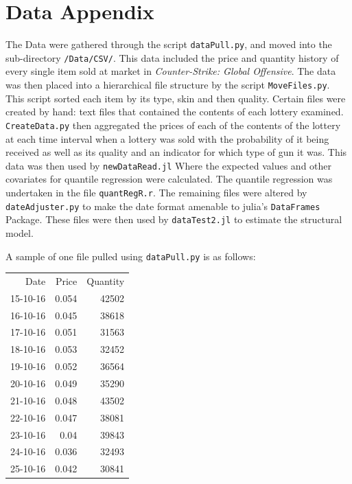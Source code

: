 \documentclass[12pt, letterpaper]{paper}
\begin{document}
\section{Data Appendix}
\label{sec-6}
The Data were gathered through the script \texttt{dataPull.py}, and moved
into the sub-directory \texttt{/Data/CSV/}. This data included the price and
quantity history of every single item sold at market in
\emph{Counter-Strike: Global Offensive}.
The data was then placed into a hierarchical file structure by the
script \texttt{MoveFiles.py}. This script sorted each item by its type, skin
and then quality. Certain files were created by hand: text files that
contained the contents of each lottery examined.
\texttt{CreateData.py} then aggregated the prices of each of the contents of
the lottery at each time interval when a lottery was sold with the
probability of it being received as well as its quality and an
indicator for which type of gun it was.
This data was then used by \texttt{newDataRead.jl} Where the expected values
and other covariates for quantile regression were calculated. The
quantile regression was undertaken in the file \texttt{quantRegR.r}.
The remaining files were altered by \texttt{dateAdjuster.py} to make the date
format amenable to julia's \texttt{DataFrames} Package. These files were then
used by \texttt{dataTest2.jl} to estimate the structural model.

A sample of one file pulled using \texttt{dataPull.py} is as follows:

\begin{center}
\begin{tabular}{rrr}
Date & Price & Quantity\\
15-10-16 & 0.054 & 42502\\
16-10-16 & 0.045 & 38618\\
17-10-16 & 0.051 & 31563\\
18-10-16 & 0.053 & 32452\\
19-10-16 & 0.052 & 36564\\
20-10-16 & 0.049 & 35290\\
21-10-16 & 0.048 & 43502\\
22-10-16 & 0.047 & 38081\\
23-10-16 & 0.04 & 39843\\
24-10-16 & 0.036 & 32493\\
25-10-16 & 0.042 & 30841\\
\end{tabular}
\end{center}
\end{document}
